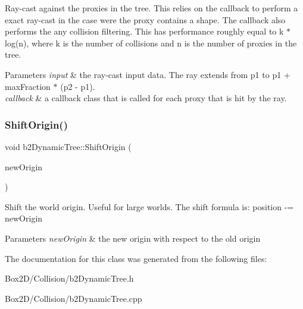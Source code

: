 Ray-\/cast against the proxies in the tree. This relies on the callback to perform a exact ray-\/cast in the case were the proxy contains a shape. The callback also performs the any collision filtering. This has performance roughly equal to k $\ast$ log(n), where k is the number of collisions and n is the number of proxies in the tree. 
\begin{DoxyParams}{Parameters}
{\em input} & the ray-\/cast input data. The ray extends from p1 to p1 + max\+Fraction $\ast$ (p2 -\/ p1). \\
\hline
{\em callback} & a callback class that is called for each proxy that is hit by the ray. \\
\hline
\end{DoxyParams}
\mbox{\label{classb2_dynamic_tree_af37ddfed6a5da97d5a78b09918d19ceb}} 
\subsubsection{\texorpdfstring{Shift\+Origin()}{ShiftOrigin()}}
{\footnotesize\ttfamily void b2\+Dynamic\+Tree\+::\+Shift\+Origin (\begin{DoxyParamCaption}\item[{const \hyperlink{structb2_vec2}{b2\+Vec2} \&}]{new\+Origin }\end{DoxyParamCaption})}

Shift the world origin. Useful for large worlds. The shift formula is\+: position -\/= new\+Origin 
\begin{DoxyParams}{Parameters}
{\em new\+Origin} & the new origin with respect to the old origin \\
\hline
\end{DoxyParams}


The documentation for this class was generated from the following files\+:\begin{DoxyCompactItemize}
\item 
Box2\+D/\+Collision/b2\+Dynamic\+Tree.\+h\item 
Box2\+D/\+Collision/b2\+Dynamic\+Tree.\+cpp\end{DoxyCompactItemize}
